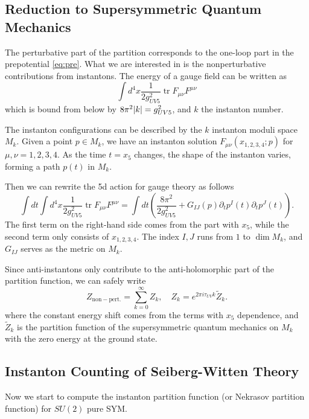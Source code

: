 \documentclass{article}
\begin{document}
\subsection{Reduction to Supersymmetric Quantum Mechanics}
The perturbative part of the partition corresponds to the one-loop part in the prepotential \eqref{eq:pre}. What we are interested in is the nonperturbative contributions from instantons. The energy of a gauge field can be written as
\begin{equation}
\int d^{4} x \frac{1}{2 g_{U V 5}^{2}} \operatorname{tr} F_{\mu \nu} F^{\mu \nu}
\end{equation}
which is bound from below by $8\pi^2\abs{k}=g_{UV5}^2$, and $k$ the instanton number.

The instanton configurations can be described by the $k$ instanton moduli space $M_k$. Given a point $p\in M_k$, we have an instanton solution $F_{\mu\nu}(x_{1,2,3,4};p)$ for $\mu,\nu=1,2,3,4$. As the time $t=x_5$ changes, the shape of the instanton varies, forming a path $p(t)$ in $M_k$. 

Then we can rewrite the 5d action for gauge theory as follows
\begin{equation}
\int d t \int d^{4} x \frac{1}{2 g_{U V 5}^{2}} \operatorname{tr} F_{\mu \nu} F^{\mu \nu}=\int d t\left(\frac{8 \pi^{2}}{2 g_{U V 5}^{2}}+G_{I J}(p) \partial_{t} p^{I}(t) \partial_{t} p^{J}(t)\right).
\end{equation}
The first term on the right-hand side comes from the part with $x_5$, while the second term only consists of $x_{1,2,3,4}$. The index $I,J$ runs from $1$ to $\dim M_k$, and $G_{IJ}$ serves as the metric on $M_k$.

Since anti-instantons only contribute to the anti-holomorphic part of the partition function, we can safely write 
\begin{equation}
\label{eq:shift}
    Z_{\mathrm{non-pert.}}=\sum_{k=0}^{\infty}Z_k,\quad Z_{k}=e^{2 \pi i \tau_{U V} k} \tilde{Z}_{k}.
\end{equation}
where the constant energy shift comes from the terms with $x_5$ dependence, and $\tilde{Z}_{k}$ is the partition function of the supersymmetric quantum mechanics on $M_k$ with the zero energy at the ground state.

\subsection{Instanton Counting of Seiberg-Witten Theory}
Now we start to compute the instanton partition function (or Nekrasov partition function) for $SU(2)$ pure SYM.
\end{document}
